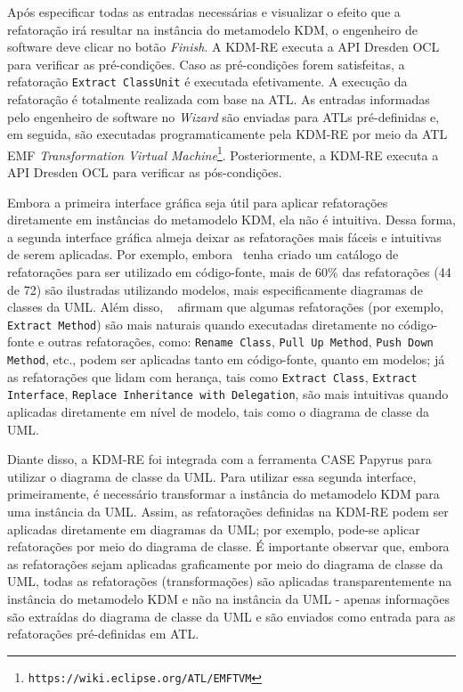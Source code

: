 Após especificar todas as entradas necessárias e visualizar o efeito que a refatoração irá resultar na instância do metamodelo KDM, o engenheiro de software deve clicar no botão \textit{Finish}. A KDM-RE executa a API Dresden OCL para verificar as pré-condições. Caso as pré-condições forem satisfeitas, a refatoração \texttt{Extract ClassUnit} é executada efetivamente. A execução da refatoração é totalmente realizada com base na ATL. As entradas informadas pelo engenheiro de software no \textit{Wizard} são enviadas para ATLs pré-definidas e, em seguida, são executadas programaticamente pela KDM-RE por meio da ATL EMF \textit{Transformation Virtual Machine}\footnote{\texttt{https://wiki.eclipse.org/ATL/EMFTVM}}. Posteriormente, a KDM-RE  executa a API Dresden OCL para verificar as pós-condições. 


Embora a primeira interface gráfica seja útil para aplicar refatorações diretamente em instâncias do metamodelo KDM, ela não é intuitiva. Dessa forma, a segunda interface gráfica almeja deixar as refatorações mais fáceis e intuitivas de serem aplicadas. Por exemplo, embora~ tenha criado um catálogo de refatorações para ser utilizado em código-fonte, mais de 60\% das refatorações (44 de 72) são ilustradas utilizando modelos, mais especificamente diagramas de classes da UML. Além disso, ~ afirmam que algumas refatorações (por exemplo, \texttt{Extract Method}) são mais naturais quando executadas diretamente no código-fonte e outras refatorações, como: \texttt{Rename Class}, \texttt{Pull Up Method}, \texttt{Push Down Method}, etc., podem ser aplicadas tanto em código-fonte, quanto em modelos; já as refatorações que lidam com herança, tais como \texttt{Extract Class}, \texttt{Extract Interface}, \texttt{Replace Inheritance with Delegation}, são mais intuitivas quando aplicadas diretamente em nível de modelo, tais como o diagrama de classe da UML. 

Diante disso, a KDM-RE foi integrada com a ferramenta CASE Papyrus para utilizar o diagrama de classe da UML. Para utilizar essa segunda interface, primeiramente, é necessário transformar a instância do metamodelo KDM para uma instância da UML. Assim, as refatorações definidas na KDM-RE podem ser aplicadas diretamente em diagramas da UML; por exemplo, pode-se aplicar refatorações por meio do diagrama de classe. É importante observar que, embora as refatorações sejam aplicadas graficamente por meio do diagrama de classe da UML, todas as refatorações (transformações) são aplicadas transparentemente na instância do metamodelo KDM e não na instância da UML - apenas informações são extraídas do diagrama de classe da UML e são enviados como entrada para as refatorações pré-definidas em ATL. %


